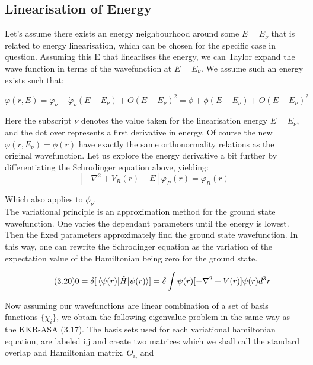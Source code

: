 \documentclass[12pt]{article}
\begin{document}
\subsection{Linearisation of Energy}

Let's assume there exists an energy neighbourhood around some $E=E_\nu$ that is related to energy linearisation, which can be chosen for the specific case in question. Assuming this E that linearlises the energy, we can Taylor expand the wave function in terms of the wavefunction at $E=E_\nu$. We assume such an energy exists such that:


\begin{equation} \label{3.18} \tag{3.18}
\varphi(r,E) = \varphi_{\nu} + \dot{\varphi}_{\nu}(E-E_\nu)+O(E-E_\nu)^2=\phi + \dot{\phi}(E-E_\nu)+O(E-E_\nu)^2
\end{equation}

Here the subscript $\nu$ denotes the value taken for the linearisation energy $E=E_\nu$, and the dot over represents a first derivative in energy. Of course the new $\varphi(r,E_\nu)=\phi(r)$ have exactly the same orthonormality relations as the original wavefunction. Let us explore the energy derivative a bit further by differentiating the Schrodinger equation above, yielding:
\begin{equation} \label{3.18} \tag{3.19}
[-\nabla^2+V_R(r)-E]\dot{\varphi}_R(r)=\varphi_R(r)
\end{equation}

Which also applies to $\phi_{\nu}$. \\
The variational principle is an approximation method for the ground state wavefunction. One varies the dependant parameters until the energy is lowest. Then the fixed parameters approximately find the ground state wavefunction. In this way, one can rewrite the Schrodinger equation as the variation of the expectation value of the Hamiltonian being zero for the ground state.

\begin{equation} \label{3.18} \tag{3.20}
0=\delta [\expval{\hat{H}}{\psi(r)}]=\delta \int \psi(r) [-\nabla^2+V(r)] \psi(r) d^3r
\end{equation}

Now assuming our wavefunctions are linear combination of a set of basis functions $\{\chi_i\}$, we obtain the following eigenvalue problem in the same way as the KKR-ASA (3.17). The basis sets used for each variational hamiltonian equation, are labeled i,j and create two matrices which we shall call the standard overlap and Hamiltonian matrix, $O_i_j$ and %
\end{document}
